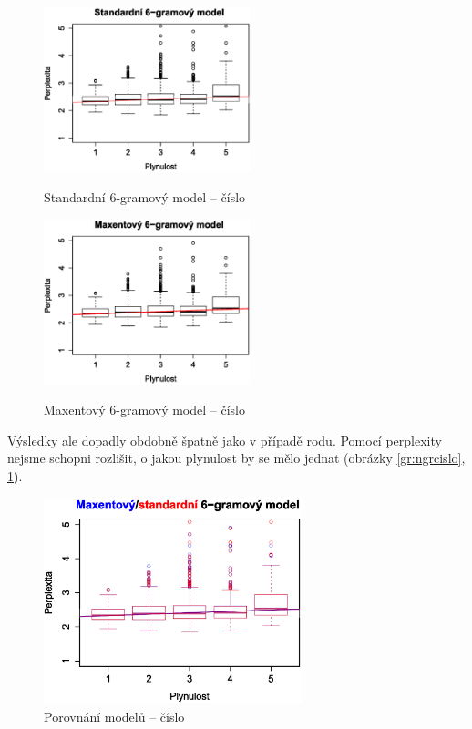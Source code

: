 \documentclass[12pt,a4paper]{report}
\begin{document}
\begin{figure}[!htb]
\begin{center}
  \centering\includegraphics[width=60mm]{./grafy/morf/ngram/cislo.svg.eps}
  \caption{Standardní 6-gramový model -- číslo}\label{gr:ngrcislo}
\endminipage\quad
{}
  \centering\includegraphics[width=60mm]{./grafy/morf/maxent/cislo.svg.eps}	
  \caption{Maxentový 6-gramový model -- číslo}\label{gr:maxcislo}
\endminipage
\end{center}
\end{figure}


Výsledky ale dopadly obdobně špatně jako v případě rodu. Pomocí perplexity nejsme schopni rozlišit, o jakou plynulost by se mělo jednat (obrázky \ref{gr:ngrcislo}, \ref{gr:maxcislo}).

\begin{figure}[!htbp]
\begin{center}
	\centering
	\includegraphics[width=75mm]{./grafy/morf/porovnani/cislo.svg.eps}
	\caption{Porovnání modelů -- číslo}\label{gr:porcislo}
\endminipage
\end{center}
\end{figure}
\end{document}
